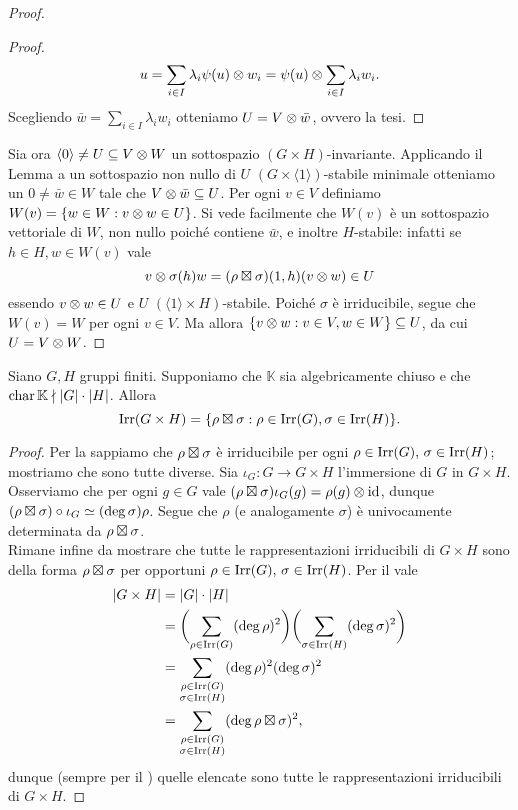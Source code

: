 \begin{proof}
\begin{proof}
$$
u=\sum_{i\in I}\lambda_i\psi(u)\otimes w_i=\psi(u)\otimes\sum_{i\in I}\lambda_i w_i.
$$
Scegliendo $\bar{w}=\sum_{i\in I}\lambda_i w_i$ otteniamo $U=V\otimes\bar{w}$, ovvero la tesi.
\end{proof}
Sia ora $\langle0\rangle\neq U\subseteq V\otimes W$ un sottospazio $(G\times H)$-invariante. Applicando il Lemma a un sottospazio non nullo di $U$ $(G\times\langle1\rangle)$-stabile minimale otteniamo un $0\neq\bar{w}\in W$ tale che $V\otimes\bar{w}\subseteq U$. Per ogni $v\in V$ definiamo $W(v)=\{w\in W:v\otimes w\in U\}$. Si vede facilmente che $W(v)$ è un sottospazio vettoriale di $W$, non nullo poiché contiene $\bar{w}$, e inoltre $H$-stabile: infatti se $h\in H\comma w\in W(v)$ vale
$$
v\otimes\sigma(h)w=(\rho\boxtimes\sigma)(1,h)(v\otimes w)\in U
$$
essendo $v\otimes w\in U$ e $U$ $(\langle1\rangle\times H)$-stabile. Poiché $\sigma$ è irriducibile, segue che $W(v)=W$ per ogni $v\in V$. Ma allora $\{v\otimes w:v\in V,w\in W\}\subseteq U$, da cui $U=V\otimes W$.
\end{proof}

\begin{corollary}
Siano $G\comma H$ gruppi finiti. Supponiamo che $\mathbb{K}$ sia algebricamente chiuso e che $\operatorname{char}\mathbb{K}\nmid|G|\cdot|H|$. Allora
$$
\operatorname{Irr}(G\times H)=\{\rho\boxtimes\sigma:\rho\in\operatorname{Irr}(G),\sigma\in\operatorname{Irr}(H)\}.
$$
\end{corollary}
\begin{proof}
Per la  sappiamo che $\rho\boxtimes\sigma$ è irriducibile per ogni $\rho\in\operatorname{Irr}(G),\,\allowbreak\sigma\in\operatorname{Irr}(H)$; mostriamo che sono tutte diverse. Sia $\iota_G:G\to G\times H$ l'immersione di $G$ in $G\times H$. Osserviamo che per ogni $g\in G$ vale $(\rho\boxtimes\sigma)\iota_G(g)=\rho(g)\otimes\operatorname{id}$, dunque $(\rho\boxtimes\sigma)\circ\iota_G\simeq(\deg\sigma)\rho$. Segue che $\rho$ (e analogamente $\sigma$) è univocamente determinata da $\rho\boxtimes\sigma$.\\
Rimane infine da mostrare che tutte le rappresentazioni irriducibili di $G\times H$ sono della forma $\rho\boxtimes\sigma$ per opportuni $\rho\in\operatorname{Irr}(G),\,\allowbreak\sigma\in\operatorname{Irr}(H)$. Per il  vale
\begin{align*}
|G\times H|&=|G|\cdot|H|\\
&=\biggl(\sum_{\rho\in\operatorname{Irr}(G)}(\deg\rho)^2\biggr)\biggl(\sum_{\sigma\in\operatorname{Irr}(H)}(\deg\sigma)^2\biggr)\\
&=\sum_{\substack{\rho\in\operatorname{Irr}(G)\\\sigma\in\operatorname{Irr}(H)}}(\deg\rho)^2(\deg\sigma)^2\\
&=\sum_{\substack{\rho\in\operatorname{Irr}(G)\\\sigma\in\operatorname{Irr}(H)}}(\deg\rho\boxtimes\sigma)^2,
\end{align*}
dunque (sempre per il ) quelle elencate sono tutte le rappresentazioni irriducibili di $G\times H$.
\end{proof}

